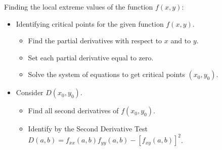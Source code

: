 Finding the local extreme values of the function $f(x,y)$:
\begin{itemize}
  \item Identifying critical points for the given function $f(x,y)$.
    \begin{itemize}
      \item Find the partial derivatives with respect to $x$ and to $y$.
      \item Set each partial derivative equal to zero.
      \item Solve the system of equations to get critical points $(x_0,y_0)$.
    \end{itemize}

  \item Consider $D(x_0,y_0)$.
    \begin{itemize}
      \item Find all second derivatives of $f(x_0,y_0)$.
      \item Identify by the Second Derivative Test $ D(a,b) = f_{xx}(a,b) f_{yy}(a,b) - [f_{xy}(a,b)]^2 $.
    \end{itemize}
\end{itemize}

\vspace*{1cm}

